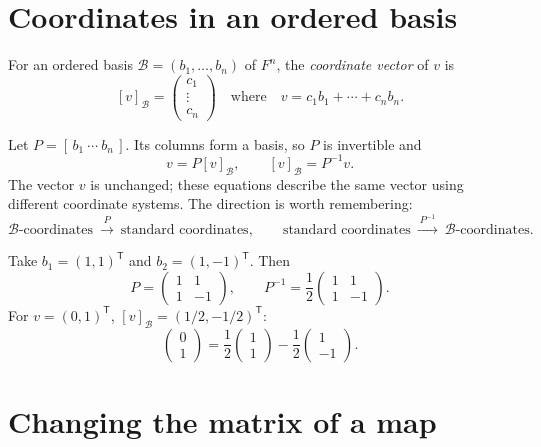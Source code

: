 \section{Coordinates in an ordered basis}

\begin{definition}
For an ordered basis $\mathcal B=(b_1,\ldots,b_n)$ of $F^n$, the
\emph{coordinate vector} of $v$ is
\[
 [v]_{\mathcal B}=\begin{pmatrix}c_1\\\vdots\\c_n\end{pmatrix}
 \quad\text{where}\quad v=c_1b_1+\cdots+c_nb_n.
\]
\end{definition}

Let $P=[\,b_1\ \cdots\ b_n\,]$. Its columns form a basis, so $P$ is
invertible and
\[
 \boxed{v=P[v]_{\mathcal B},\qquad [v]_{\mathcal B}=P^{-1}v.}
\]
The vector $v$ is unchanged; these equations describe the same vector
using different coordinate systems.
The direction is worth remembering:
\[
 \mathcal B\text{-coordinates}
 \ \xrightarrow{\ P\ }\ \text{standard coordinates},
 \qquad
 \text{standard coordinates}
 \ \xrightarrow{\ P^{-1}\ }\ \mathcal B\text{-coordinates}.
\]

\begin{example}
Take $b_1=(1,1)^{\mathsf T}$ and $b_2=(1,-1)^{\mathsf T}$.
Then
\[
 P=\begin{pmatrix}1&1\\1&-1\end{pmatrix},\qquad
 P^{-1}=\frac12\begin{pmatrix}1&1\\1&-1\end{pmatrix}.
\]
For $v=(0,1)^{\mathsf T}$, $[v]_{\mathcal B}=(1/2,-1/2)^{\mathsf T}$:
\[
 \begin{pmatrix}0\\1\end{pmatrix}
 =\frac12\begin{pmatrix}1\\1\end{pmatrix}
  -\frac12\begin{pmatrix}1\\-1\end{pmatrix}.
\]
\end{example}

\section{Changing the matrix of a map}

